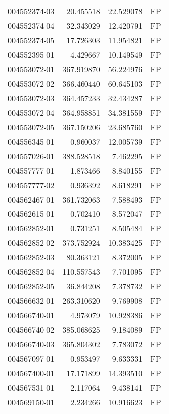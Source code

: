 \begin{tabular}{lrrl}
004552374-03 &   20.455518 &      22.529078 &   FP \\
004552374-04 &   32.343029 &      12.420791 &   FP \\
004552374-05 &   17.726303 &      11.954821 &   FP \\
004552395-01 &    4.429667 &      10.149549 &   FP \\
004553072-01 &  367.919870 &      56.224976 &   FP \\
004553072-02 &  366.460440 &      60.645103 &   FP \\
004553072-03 &  364.457233 &      32.434287 &   FP \\
004553072-04 &  364.958851 &      34.381559 &   FP \\
004553072-05 &  367.150206 &      23.685760 &   FP \\
004556345-01 &    0.960037 &      12.005739 &   FP \\
004557026-01 &  388.528518 &       7.462295 &   FP \\
004557777-01 &    1.873466 &       8.840155 &   FP \\
004557777-02 &    0.936392 &       8.618291 &   FP \\
004562467-01 &  361.732063 &       7.588493 &   FP \\
004562615-01 &    0.702410 &       8.572047 &   FP \\
004562852-01 &    0.731251 &       8.505484 &   FP \\
004562852-02 &  373.752924 &      10.383425 &   FP \\
004562852-03 &   80.363121 &       8.372005 &   FP \\
004562852-04 &  110.557543 &       7.701095 &   FP \\
004562852-05 &   36.844208 &       7.378732 &   FP \\
004566632-01 &  263.310620 &       9.769908 &   FP \\
004566740-01 &    4.973079 &      10.928386 &   FP \\
004566740-02 &  385.068625 &       9.184089 &   FP \\
004566740-03 &  365.804302 &       7.783072 &   FP \\
004567097-01 &    0.953497 &       9.633331 &   FP \\
004567400-01 &   17.171899 &      14.393510 &   FP \\
004567531-01 &    2.117064 &       9.438141 &   FP \\
004569150-01 &    2.234266 &      10.916623 &   FP \\

\end{tabular}
